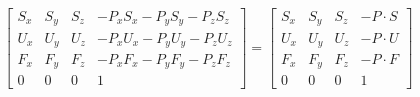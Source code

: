 \documentclass[preview]{standalone}
\begin{document}
\[
  \begin{bmatrix}
    S_x & S_y & S_z & -P_xS_x - P_yS_y -P_zS_z \\
    U_x & U_y & U_z & -P_xU_x - P_yU_y -P_zU_z \\
    F_x & F_y & F_z & -P_xF_x - P_yF_y -P_zF_z \\
    0 & 0 & 0 & 1 
  \end{bmatrix} =
  \begin{bmatrix}
    S_x & S_y & S_z & -P \cdot S \\
    U_x & U_y & U_z & -P \cdot U\\
    F_x & F_y & F_z & -P \cdot F\\
    0 & 0 & 0 & 1 
  \end{bmatrix}
\]
\end{document}
